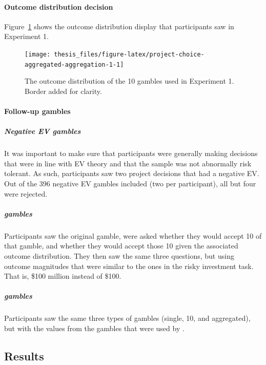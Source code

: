 \documentclass[a4paper, nobind, dvipsnames]{templates/ociamthesis}
\theoremstyle{definition}
\theoremstyle{definition}
\theoremstyle{definition}
\theoremstyle{definition}
\theoremstyle{remark}
\begin{document}
\paragraph{Outcome distribution decision}

Figure~\ref{fig:project-choice-aggregated-aggregation-1} shows the outcome
distribution display that participants saw in Experiment 1.



\begin{figure}
\texttt{[image: thesis\_files/figure-latex/project-choice-aggregated-aggregation-1-1]} \caption{The outcome distribution of the 10 gambles used in Experiment 1. Border added for clarity.}\label{fig:project-choice-aggregated-aggregation-1}
\end{figure}

\hypertarget{follow-up-materials-aggregation-1-appendix}{%
\paragraph{Follow-up gambles}\label{follow-up-materials-aggregation-1-appendix}}

\subparagraph{Negative EV gambles}

It was important to make sure that participants were generally making decisions
that were in line with EV theory and that the sample was not abnormally risk
tolerant. As such, participants saw two project decisions that had a negative
EV. Out of the 396 negative EV gambles
included (two per participant), all but four
were rejected.

\subparagraph{\texorpdfstring{\textcite{samuelson1963} gambles}{Samuelson (1963) gambles}}

Participants saw the original \textcite{samuelson1963} gamble, were asked whether they
would accept 10 of that gamble, and whether they would accept those 10 given the
associated outcome distribution. They then saw the same three questions, but
using outcome magnitudes that were similar to the ones in the risky investment
task. That is, \$100 million instead of \$100.

\subparagraph{\texorpdfstring{\textcite{redelmeier1992} gambles}{Redelmeier \& Tversky (1992) gambles}}

Participants saw the same three types of gambles (single, 10, and aggregated),
but with the values from the gambles that were used by \textcite{redelmeier1992}.

\hypertarget{results-aggregation-1-appendix}{%
\subsection{Results}\label{results-aggregation-1-appendix}}
\end{document}
